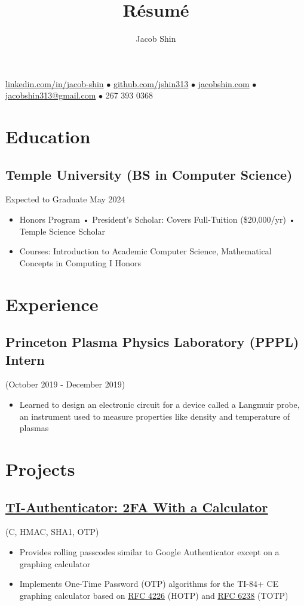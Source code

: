 \documentclass{article}
\makeatletter
\renewcommand{\maketitle}{
    \begin{center}
        {\huge\bfseries
        \theauthor}
    \end{center}
    \begin{center}
        \vspace{1em}
        \leavevmode
        \href{https://linkedin.com/in/jacob-shin}{linkedin.com/in/jacob-shin} $\bullet$ \href{https://github.com/jshin313}{github.com/jshin313} $\bullet$ \href{https://jacobshin.com}{jacobshin.com} $\bullet$ \href{jacobshin313@gmail.com}{jacobshin313@gmail.com} $\bullet$ 267 393 0368
    \end{center}
}
\makeatother
\begin{document}
\title{R\'esum\'e}
\author{Jacob Shin}

\maketitle
\section{Education}
\subsection{Temple University (BS in Computer Science)}\hspace{4em} Expected to Graduate May 2024
\begin{itemize}
    \item Honors Program • President's Scholar: Covers Full-Tuition (\$20,000/yr) • Temple Science Scholar
    \item Courses: Introduction to Academic Computer Science, Mathematical Concepts in Computing I Honors 
\end{itemize}

\section{Experience}
\subsection{Princeton Plasma Physics Laboratory (PPPL) Intern} (October 2019 - December 2019)
\begin{itemize}
    \item Learned to design an electronic circuit for a device called a Langmuir probe, an instrument used to measure properties like density and temperature of plasmas
\end{itemize}

\section{Projects}
\subsection{\href{https://github.com/jshin313/ti-authenticator}{\underline{TI-Authenticator: 2FA With a Calculator}}} (C, HMAC, SHA1, OTP)
\begin{itemize}
    \item Provides rolling passcodes similar to Google Authenticator except on a graphing calculator
    \item Implements One-Time Password (OTP) algorithms for the TI-84+ CE graphing calculator based on \href{https://tools.ietf.org/html/rfc4226}{\underline{RFC 4226}} (HOTP) and \href{https://tools.ietf.org/html/rfc6238}{\underline{RFC 6238}} (TOTP)
\end{itemize}
\end{document}
